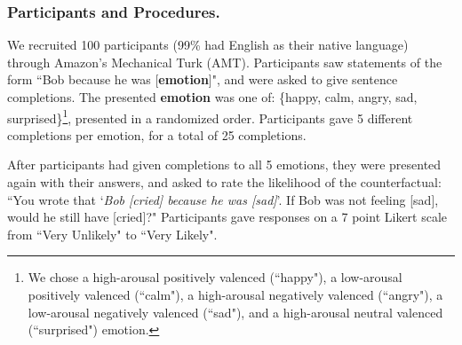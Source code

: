 \documentclass[10pt,letterpaper]{article}
\begin{document}
\subsubsection{Participants and Procedures.} 
We recruited 100 participants (99\% had English as their native language) through Amazon's Mechanical Turk (AMT). Participants saw statements of the form ``Bob \underline{\hspace{2em}} because he was [\textbf{emotion}]", and were asked to give sentence completions. The presented \textbf{emotion} was one of: \{happy, calm, angry, sad, surprised\}\footnote{We chose a high-arousal positively valenced (``happy"), a low-arousal positively valenced (``calm"), a high-arousal negatively valenced (``angry"), a low-arousal negatively valenced (``sad"), and a high-arousal neutral valenced (``surprised") emotion.},
presented in a randomized order. 
Participants gave 5 different completions per emotion, for a total of 25 completions.

After participants had given completions to all 5 emotions, they were presented again with their answers, and asked to rate the likelihood of the counterfactual: ``You wrote that `\textit{Bob [cried] because he was [sad]}'. If Bob was not feeling [sad], would he still have [cried]?" 
Participants gave responses on a 7 point Likert scale from ``Very Unlikely" to ``Very Likely". 
\end{document}
